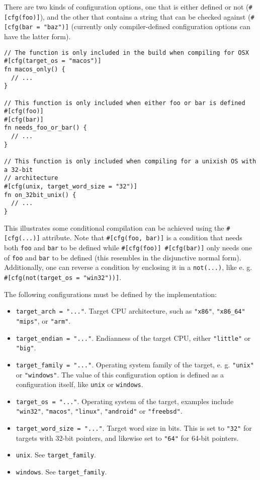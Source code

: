 \documentclass[]{article}
\begin{document}
There are two kinds of configuration options, one that is either defined
or not (\texttt{\#{[}cfg(foo){]}}), and the other that contains a string
that can be checked against (\texttt{\#{[}cfg(bar = "baz"){]}}
(currently only compiler-defined configuration options can have the
latter form).

\begin{verbatim}
// The function is only included in the build when compiling for OSX
#[cfg(target_os = "macos")]
fn macos_only() {
  // ...
}

// This function is only included when either foo or bar is defined
#[cfg(foo)]
#[cfg(bar)]
fn needs_foo_or_bar() {
  // ...
}

// This function is only included when compiling for a unixish OS with a 32-bit
// architecture
#[cfg(unix, target_word_size = "32")]
fn on_32bit_unix() {
  // ...
}
\end{verbatim}

This illustrates some conditional compilation can be achieved using the
\texttt{\#{[}cfg(...){]}} attribute. Note that
\texttt{\#{[}cfg(foo, bar){]}} is a condition that needs both
\texttt{foo} and \texttt{bar} to be defined while
\texttt{\#{[}cfg(foo){]} \#{[}cfg(bar){]}} only needs one of
\texttt{foo} and \texttt{bar} to be defined (this resembles in the
disjunctive normal form). Additionally, one can reverse a condition by
enclosing it in a \texttt{not(...)}, like e. g.
\texttt{\#{[}cfg(not(target\_os = "win32")){]}}.

The following configurations must be defined by the implementation:

\begin{itemize}
\itemsep1pt\parskip0pt
\item
  \texttt{target\_arch = "..."}. Target CPU architecture, such as
  \texttt{"x86"}, \texttt{"x86\_64"} \texttt{"mips"}, or \texttt{"arm"}.
\item
  \texttt{target\_endian = "..."}. Endianness of the target CPU, either
  \texttt{"little"} or \texttt{"big"}.
\item
  \texttt{target\_family = "..."}. Operating system family of the
  target, e. g. \texttt{"unix"} or \texttt{"windows"}. The value of this
  configuration option is defined as a configuration itself, like
  \texttt{unix} or \texttt{windows}.
\item
  \texttt{target\_os = "..."}. Operating system of the target, examples
  include \texttt{"win32"}, \texttt{"macos"}, \texttt{"linux"},
  \texttt{"android"} or \texttt{"freebsd"}.
\item
  \texttt{target\_word\_size = "..."}. Target word size in bits. This is
  set to \texttt{"32"} for targets with 32-bit pointers, and likewise
  set to \texttt{"64"} for 64-bit pointers.
\item
  \texttt{unix}. See \texttt{target\_family}.
\item
  \texttt{windows}. See \texttt{target\_family}.
\end{itemize}
\end{document}

